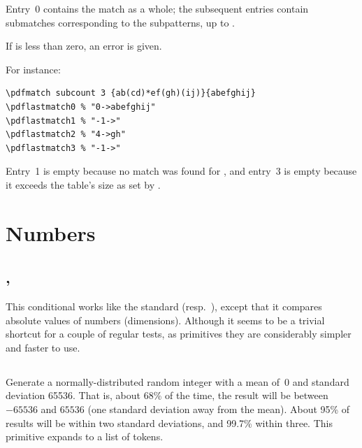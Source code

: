 \documentclass{pdftexmanual}
\begin{document}
Entry~0 contains the match as a whole; the subsequent entries contain
submatches corresponding to the subpatterns, up to .

If  is less than zero, an error is given.

For instance:

\begin{verbatim}
\pdfmatch subcount 3 {ab(cd)*ef(gh)(ij)}{abefghij}
\pdflastmatch0 % "0->abefghij"
\pdflastmatch1 % "-1->"
\pdflastmatch2 % "4->gh"
\pdflastmatch3 % "-1->"
\end{verbatim}

Entry~1 is empty because no match was found for , and entry~3
is empty because it exceeds the table's size as set by .

\section{Numbers}

\subsection{, }

This conditional works like the standard  (resp.\ ),
except that it compares absolute values of numbers (dimensions).
Although it seems to be a trivial shortcut for a couple of regular
 tests, as primitives they are considerably simpler and faster to
use. 

\subsection{}

Generate a normally-distributed random integer with a mean of~0 and
standard deviation 65536. That is, about 68\% of the time, the result
will be between $-65536$ and $65536$ (one standard deviation away from
the mean). About 95\% of results will be within two standard deviations,
and 99.7\% within three. This primitive expands to a list of tokens.

\subsection{}
\end{document}
